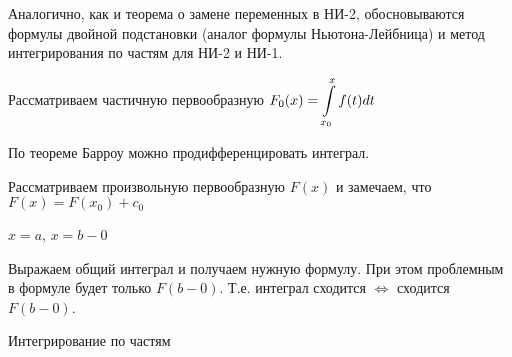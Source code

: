 \begin{col-answer-preambule}
		Аналогично, как и теорема о замене переменных в НИ-2, обосновываются формулы двойной подстановки (аналог формулы Ньютона-Лейбница) и метод интегрирования по частям для НИ-2 и НИ-1.
\end{col-answer-preambule}

\begin{plan}
\item Рассматриваем частичную первообразную $F_0(x) = \displaystyle\int\limits_{x_0}^xf(t)dt$
\item По теореме Барроу можно продифференцировать интеграл.
\item Рассматриваем произвольную первообразную $F(x)$ и замечаем, что $F(x) = F(x_0) + c_0$
\item $x = a$, $x = b - 0$
\item Выражаем общий интеграл и получаем нужную формулу. При этом проблемным в формуле будет только $F(b-0)$. Т.е. интеграл сходится $\Leftrightarrow$ сходится $F(b-0)$.
\end{plan}
Интегрирование по частям

